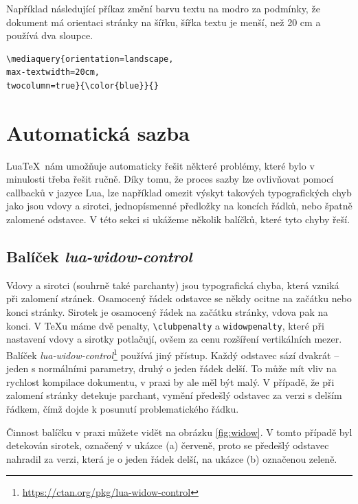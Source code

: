 \documentclass{csbulletin}
\newcommand\balicek[1]{\textit{#1}}
\begin{document}
Například následující příkaz změní barvu textu na modro za podmínky, že dokument 
má orientaci stránky na šířku, šířka textu je menší, než 20 cm a používá dva sloupce.

\begin{verbatim}
\mediaquery{orientation=landscape,
max-textwidth=20cm,
twocolumn=true}{\color{blue}}{}
\end{verbatim}


\section{Automatická sazba}

Lua\TeX\ nám umožňuje automaticky řešit některé problémy, které bylo v minulosti třeba řešit ručně. Díky tomu, že proces sazby lze ovlivňovat pomocí callbacků v jazyce Lua, lze například omezit výskyt takových typografických chyb jako jsou vdovy a sirotci, jednopísmenné předložky na koncích řádků, nebo špatně zalomené odstavce. V této sekci si ukážeme několik balíčků, které tyto chyby řeší.




  \subsection{Balíček \balicek{lua-widow-control}}

Vdovy a sirotci (souhrně také parchanty) jsou typografická chyba, která vzniká při zalomení stránek. Osamocený řádek odstavce se někdy ocitne na začátku nebo konci stránky. Sirotek je osamocený řádek na začátku stránky, vdova pak na konci. V \TeX u máme dvě penalty, \verb|\clubpenalty| a \verb|widowpenalty|, které při nastavení vdovy a sirotky potlačují, ovšem za cenu rozšíření vertikálních mezer. Balíček \balicek{lua-widow-control}\footnote{\url{https://ctan.org/pkg/lua-widow-control}} používá jiný přístup. Každý odstavec sází dvakrát -- jeden s normálními parametry, druhý o jeden řádek delší. To může mít vliv na rychlost kompilace dokumentu, v praxi by ale měl být malý. V případě, že při zalomení stránky detekuje parchant, vymění předešlý odstavec za verzi s delším řádkem, čímž dojde k posunutí problematického řádku.

Činnost balíčku v praxi můžete vidět na obrázku \ref{fig:widow}. V tomto případě byl detekován sirotek, označený v ukázce (a) červeně, proto se předešlý odstavec nahradil za verzi, která je o jeden řádek delší, na ukázce (b) označenou zeleně. 
\end{document}
